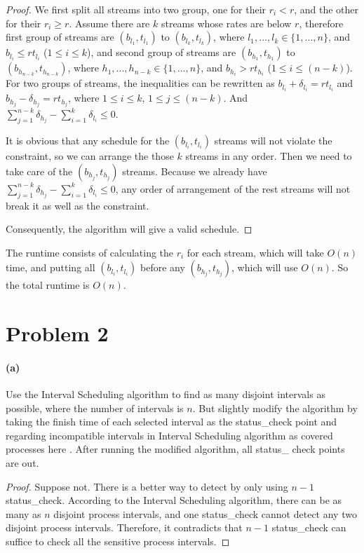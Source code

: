 \documentclass[letter,12pt]{article}
\begin{document}
\begin{proof}
We first split all streams into two group, one for their $r_i < r$, and the
other for their $r_i \geq r$. Assume there are $k$ streams whose rates
are below $r$, therefore first group of streams are $(b_{l_1}, t_{l_1})$ to
$(b_{l_k}, t_{l_k})$, where $l_1, ..., l_k \in \{1, ..., n\}$, and $b_{l_i} \le 
rt_{l_i}$ ($1 \le i \le k$), and second group of streams are $(b_{h_1}, 
t_{h_1})$ to $(b_{h_{n-k}}, t_{h_{n-k}})$, where $h_1, ..., h_{n-k} \in 
\{1, ..., n\}$, and $b_{h_i} > rt_{h_i}$ ($1 \le i \le (n-k)$). For two groups
of streams, the inequalities can be rewritten as $b_{l_i} + \delta_{l_i} 
= rt_{l_i}$ and $b_{h_j} - \delta_{h_j} = rt_{h_j}$, where $1 \le i \le k$,
$1 \le j \le (n-k)$. And $\sum\limits_{j=1}^{n-k} \delta_{h_j} - \sum\limits_{i=1}^k \delta_{l_i} \le 0$.

It is obvious that any schedule for the $(b_{l_i}, t_{l_i})$ streams will not
violate the constraint, so we can arrange the those $k$ streams in any
order. Then we need to take care of the $(b_{h_j}, t_{h_j})$ streams.
Because we already have $\sum\limits_{j=1}^{n-k} \delta_{h_j} - \sum\limits_{i=1}^k \delta_{l_i} \le 0$, any order of arrangement of 
the rest streams will not break it as well as the constraint.

Consequently, the algorithm will give a valid schedule.
\end{proof}

The runtime consists of calculating the $r_i$ for each stream, which
will take $O(n)$ time, and putting all $(b_{l_i}, t_{l_i})$ before any
$(b_{h_j}, t_{h_j})$, which will use $O(n)$. So the total runtime is $O(n)$.

\section*{Problem 2}
\paragraph*{(a)}
Use the Interval Scheduling algorithm to find as many disjoint intervals
as possible, where the number of intervals is $n$. But slightly modify
the algorithm by taking the finish time of each selected interval as
the \textsf{status\_check} point and regarding incompatible intervals
in Interval Scheduling algorithm as covered processes here . After 
running the modified algorithm, all \textsf{status\_ check} points are out. 

\begin{proof}
Suppose not. There is a better way to detect by only using $n-1$ 
\textsf{status\_check}. According to the Interval Scheduling algorithm,
there can be as many as $n$ disjoint process intervals, and one 
\textsf{status\_check} cannot detect any two disjoint process intervals.
Therefore, it contradicts that $n-1$ \textsf{status\_check} can suffice 
to check all the sensitive process intervals.
\end{proof}
\end{document}
